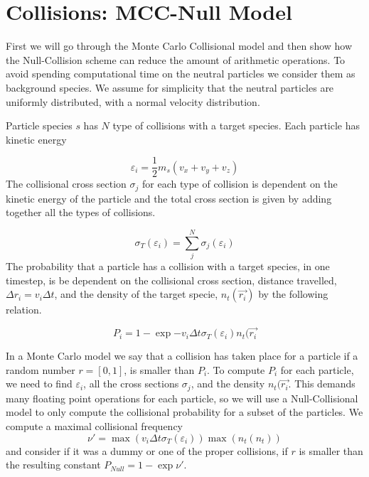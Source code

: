 \section{Collisions: MCC-Null Model}
    First we will go through the Monte Carlo Collisional model and then show how
    the Null-Collision scheme can reduce the amount of arithmetic operations.
    To avoid spending computational time on the neutral particles we consider
    them as background species.
    We assume for simplicity that the neutral particles are
    uniformly distributed, with a normal velocity distribution.

    Particle species \(s\) has \(N\) type of collisions with a target species. Each particle
    has kinetic energy

    \begin{equation}
        \varepsilon_i = \frac{1}{2}m_s \left(v_x + v_y +v_z \right)
    \end{equation}
    The collisional cross section \(\sigma_j\) for each type of collision is dependent on the
    kinetic energy of the particle and the total cross section is given by adding
    together all the types of collisions.

    \begin{equation}
        \sigma_T(\varepsilon_i) = \sum_j^N \sigma_j(\varepsilon_i)
    \end{equation}
    The probability that a particle has a collision with a target species, in one timestep, is
    be dependent on the collisional cross section, distance travelled, \(\Delta r_i = v_i\Delta t\), and the
    density of the target specie, \( n_t(\vec{r_i}) \) by the following relation.

    \begin{equation}
        P_i = 1-\exp{-v_i\Delta t \sigma_T(\varepsilon_i) n_t(\vec{r_i} }
    \end{equation}

    In a Monte Carlo model we say that a collision has taken place for a particle if a random number
    \(r = [0,1]\), is smaller than \(P_i\).
    To compute \(P_i\) for each particle, we need to find \(\varepsilon_i\), all the cross sections
    \(\sigma_j\), and the density \(n_t(\vec{r_i}\). This demands many floating point operations for
    each particle, so we will use a Null-Collisional model to only compute the collisional
    probability for a subset of the particles. We compute a maximal collisional frequency
    \begin{equation}
        \nu'= \max({v_i\Delta t \sigma_T(\varepsilon_i)})\max({n_t(n_t)})
    \end{equation}
    and consider if it was a dummy or one of the proper collisions, if \(r\) is smaller
    than the resulting constant \(P_{Null} =  1-\exp{\nu'}\).

